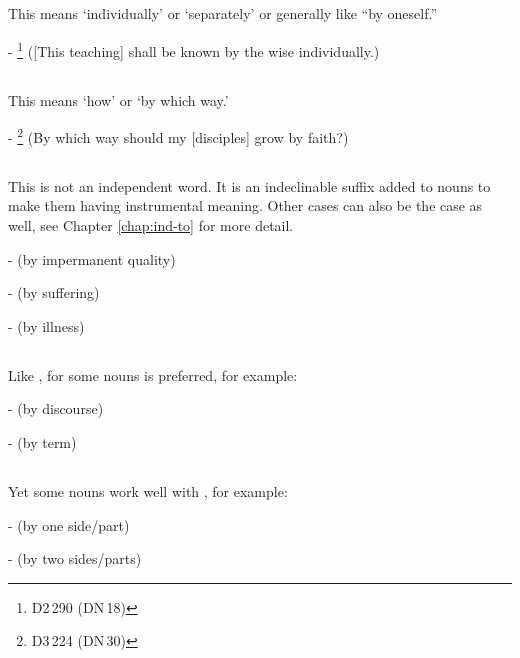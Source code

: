 \subsection*{}\label{nip:paccattadm}
This means `individually' or `separately' or generally like ``by oneself.''\par
- \footnote{D2\,290 (DN\,18)} ([This teaching] shall be known by the wise individually.) \par

\subsection*{}\label{nip:kinti}
This means `how' or `by which way.'\par
- \footnote{D3\,224 (DN\,30)} (By which way should my [disciples] grow by faith?) \par

\subsection*{}\label{nip:to1}
This is not an independent word. It is an indeclinable suffix added to nouns to make them having instrumental meaning. Other cases can also be the case as well, see Chapter \ref{chap:ind-to} for more detail.\par
-  (by impermanent quality) \par
-  (by suffering) \par
-  (by illness) \par

\subsection*{}\label{nip:so1}
Like , for some nouns  is preferred, for example:\par
-  (by discourse) \par
-  (by term) \par

\subsection*{}\label{nip:dhaa}
Yet some nouns work well with , for example:\par
-  (by one side/part) \par
-  (by two sides/parts) \par


